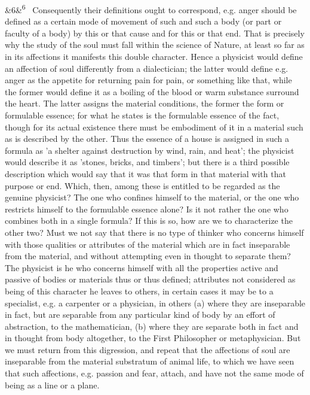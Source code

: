 \documentclass[12pt]{article}
\newcommand{\para}[1][]{\par\noindent\ifx&#1&\else\textsuperscript{\footnotesize #1}~\fi}
\begin{document}
\para[6] Consequently their definitions ought to correspond, e.g. anger should be defined as a certain mode of movement of such and such a body (or part or faculty of a body) by this or that cause and for this or that end. That is precisely why the study of the soul must fall within the science of Nature, at least so far as in its affections it manifests this double character. Hence a physicist would define an affection of soul differently from a dialectician; the latter would define e.g. anger as the appetite for returning pain for pain, or something like that, while the former would define it as a boiling of the blood or warm substance surround the heart. The latter assigns the material conditions, the former the form or formulable essence; for what he states is the formulable essence of the fact, though for its actual existence there must be embodiment of it in a material such as is described by the other. Thus the essence of a house is assigned in such a formula as 'a shelter against destruction by wind, rain, and heat'; the physicist would describe it as 'stones, bricks, and timbers'; but there is a third possible description which would say that it was that form in that material with that purpose or end. Which, then, among these is entitled to be regarded as the genuine physicist? The one who confines himself to the material, or the one who restricts himself to the formulable essence alone? Is it not rather the one who combines both in a single formula? If this is so, how are we to characterize the other two? Must we not say that there is no type of thinker who concerns himself with those qualities or attributes of the material which are in fact inseparable from the material, and without attempting even in thought to separate them? The physicist is he who concerns himself with all the properties active and passive of bodies or materials thus or thus defined; attributes not considered as being of this character he leaves to others, in certain cases it may be to a specialist, e.g. a carpenter or a physician, in others (a) where they are inseparable in fact, but are separable from any particular kind of body by an effort of abstraction, to the mathematician, (b) where they are separate both in fact and in thought from body altogether, to the First Philosopher or metaphysician. But we must return from this digression, and repeat that the affections of soul are inseparable from the material substratum of animal life, to which we have seen that such affections, e.g. passion and fear, attach, and have not the same mode of being as a line or a plane.
\end{document}
